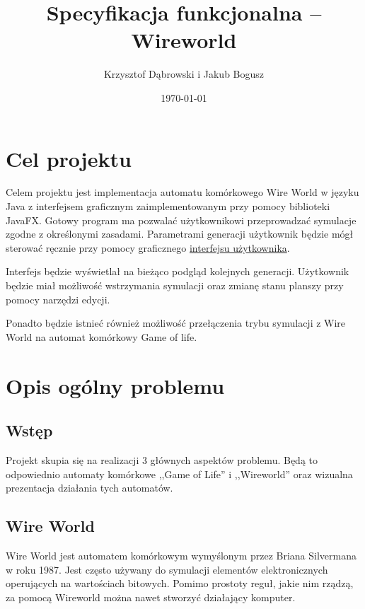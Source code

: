 \documentclass{report}
\title{Specyfikacja funkcjonalna -- Wireworld}
\author{Krzysztof Dąbrowski i Jakub Bogusz}
\date{\today}
\begin{document}
\maketitle{}

\tableofcontents{}

\chapter{Cel projektu}
Celem projektu jest implementacja automatu komórkowego Wire World w języku Java z interfejsem graficznym zaimplementowanym przy pomocy biblioteki JavaFX. Gotowy program ma pozwalać użytkownikowi przeprowadzać symulacje zgodne z określonymi zasadami. Parametrami generacji użytkownik będzie mógł sterować ręcznie przy pomocy graficznego \hyperref[sec:wyglad-gui]{\textcolor{LinkColor}{interfejsu użytkownika}}.

Interfejs będzie wyświetlał na bieżąco podgląd kolejnych generacji. Użytkownik będzie miał możliwość wstrzymania symulacji oraz zmianę stanu planszy przy pomocy narzędzi edycji.

Ponadto będzie istnieć również możliwość przełączenia trybu symulacji z Wire World na automat komórkowy Game of life.

\chapter{Opis ogólny problemu}

\section{Wstęp}
Projekt skupia się na realizacji 3 głównych aspektów problemu. Będą to odpowiednio automaty komórkowe ,,Game of Life'' i ,,Wireworld'' oraz wizualna prezentacja działania tych automatów. 

\section{Wire World}

Wire World jest automatem komórkowym wymyślonym przez Briana Silvermana w roku 1987.  Jest często używany do symulacji elementów elektronicznych operujących na wartościach bitowych. Pomimo prostoty reguł, jakie nim rządzą, za pomocą Wireworld można nawet stworzyć działający komputer.
\end{document}

